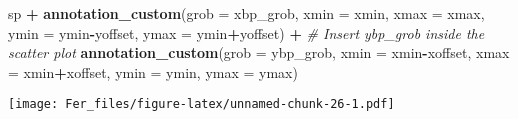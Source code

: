 \documentclass[
]{article}
\newenvironment{Shaded}{\begin{snugshade}}{\end{snugshade}}
\newcommand{\AttributeTok}[1]{\textcolor[rgb]{0.13,0.29,0.53}{#1}}
\newcommand{\CommentTok}[1]{\textcolor[rgb]{0.56,0.35,0.01}{\textit{#1}}}
\newcommand{\FunctionTok}[1]{\textcolor[rgb]{0.13,0.29,0.53}{\textbf{#1}}}
\newcommand{\NormalTok}[1]{#1}
\newcommand{\SpecialCharTok}[1]{\textcolor[rgb]{0.81,0.36,0.00}{\textbf{#1}}}
\begin{document}
\begin{Shaded}
\begin{Highlighting}[]
\NormalTok{sp }\SpecialCharTok{+} \FunctionTok{annotation\_custom}\NormalTok{(}\AttributeTok{grob =}\NormalTok{ xbp\_grob, }\AttributeTok{xmin =}\NormalTok{ xmin, }\AttributeTok{xmax =}\NormalTok{ xmax, }
                       \AttributeTok{ymin =}\NormalTok{ ymin}\SpecialCharTok{{-}}\NormalTok{yoffset, }\AttributeTok{ymax =}\NormalTok{ ymin}\SpecialCharTok{+}\NormalTok{yoffset) }\SpecialCharTok{+}
  \CommentTok{\# Insert ybp\_grob inside the scatter plot}
  \FunctionTok{annotation\_custom}\NormalTok{(}\AttributeTok{grob =}\NormalTok{ ybp\_grob,}
                    \AttributeTok{xmin =}\NormalTok{ xmin}\SpecialCharTok{{-}}\NormalTok{xoffset, }\AttributeTok{xmax =}\NormalTok{ xmin}\SpecialCharTok{+}\NormalTok{xoffset, }
                    \AttributeTok{ymin =}\NormalTok{ ymin, }\AttributeTok{ymax =}\NormalTok{ ymax)}
\end{Highlighting}
\end{Shaded}

\texttt{[image: Fer\_files/figure-latex/unnamed-chunk-26-1.pdf]}
\end{document}
